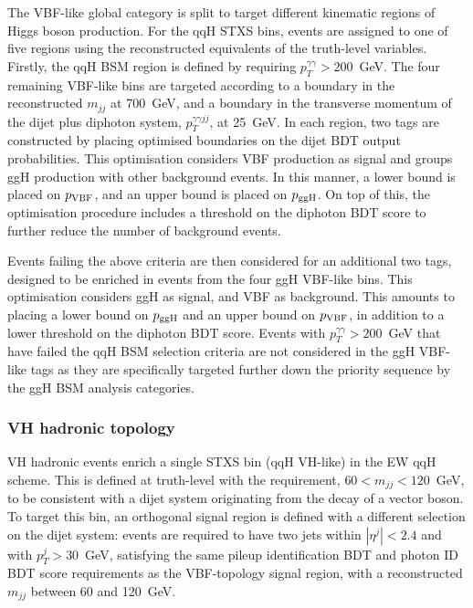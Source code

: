 The VBF-like global category is split to target different kinematic regions of Higgs boson production. For the qqH STXS bins, events are assigned to one of five regions using the reconstructed equivalents of the truth-level variables. Firstly, the qqH BSM region is defined by requiring $p_T^{\gamma\gamma}>200$~GeV. The four remaining VBF-like bins are targeted according to a boundary in the reconstructed $m_{jj}$ at 700~GeV, and a boundary in the transverse momentum of the dijet plus diphoton system, $p_T^{\gamma\gamma jj}$, at 25~GeV. In each region, two tags are constructed by placing optimised boundaries on the dijet BDT output probabilities. This optimisation considers VBF production as signal and groups ggH production with other background events. In this manner, a lower bound is placed on $p_{\rm{VBF}}$, and an upper bound is placed on $p_{\rm{ggH}}$. On top of this, the optimisation procedure includes a threshold on the diphoton BDT score to further reduce the number of background events.

Events failing the above criteria are then considered for an additional two tags, designed to be enriched in events from the four ggH VBF-like bins. This optimisation considers ggH as signal, and VBF as background. This amounts to placing a lower bound on $p_{\rm{ggH}}$ and an upper bound on $p_{\rm{VBF}}$, in addition to a lower threshold on the diphoton BDT score. Events with $p_T^{\gamma\gamma}>200$~GeV that have failed the qqH BSM selection criteria are not considered in the ggH VBF-like tags as they are specifically targeted further down the priority sequence by the ggH BSM analysis categories.

\subsubsection{VH hadronic topology}
VH hadronic events enrich a single STXS bin (qqH VH-like) in the EW qqH scheme. This is defined at truth-level with the requirement, $60<m_{jj}<120$~GeV, to be consistent with a dijet system originating from the decay of a vector boson. To target this bin, an orthogonal signal region is defined with a different selection on the dijet system: events are required to have two jets within $|\eta^j|<2.4$ and with $p_T^j>30$~GeV, satisfying the same pileup identification BDT and photon ID BDT score requirements as the VBF-topology signal region, with a reconstructed $m_{jj}$ between 60 and 120~GeV. 

